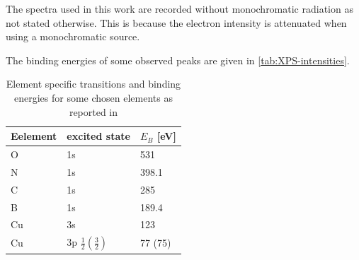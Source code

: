 
The spectra used in this work are recorded without monochromatic radiation as not stated otherwise. This is because the electron intensity is attenuated when using a monochromatic source.

The  binding energies of some observed peaks are given in \autoref{tab:XPS-intensities}.
\begin{table}\centering
 \caption{Element specific transitions and binding energies for some chosen elements as reported in \cite{wanger_handbook_1979}}
 \begin{tabular}{lll}
  Eelement & excited state & $E_B$ [eV]\\ \hline 
  O & 1s & 531\\
  N & 1s & 398.1\\
  C & 1s & 285\\
  B & 1s & 189.4 \\
  Cu & 3s & 123\\
  Cu & 3p $\frac{1}{2} (\frac{3}{2})$ & 77 (75)\\
 \end{tabular}
\label{tab:XPS-intensities}
\end{table}

